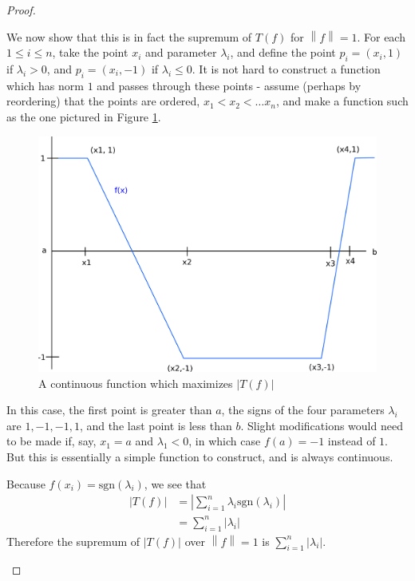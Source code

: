 \documentclass[12pt]{article}
\theoremstyle{definition}
\begin{document}
\begin{proof}
\begin{enumerate}[label=(\roman*)]
	We now show that this is in fact the supremum of $T(f)$ for $\left \lVert { f } \right \lVert = 1$. For each $1 \leq i \leq n$, take the point $x_i$ and parameter $\lambda_i$, and define the point $p_i = (x_i, 1)$ if $\lambda_i > 0$, and $p_i = (x_i, -1)$ if $\lambda_i \leq 0$. It is not hard to construct a function which has norm $1$ and passes through these points - assume (perhaps by reordering) that the points are ordered, $x_1 < x_2 < \dots x_n$, and make a function such as the one pictured in Figure \ref{fig:function}. 
	\begin{figure}
		\centering
		\includegraphics{hw_2_function.png}
		\caption{A continuous function which maximizes $\left \lvert { T(f) } \right \lvert $}
		\label{fig:function}
	\end{figure}
	In this case, the first point is greater than $a$, the signs of the four parameters $\lambda_i$ are $1, -1, -1, 1$, and the last point is less than $b$. Slight modifications would need to be made if, say, $x_1 = a$ and $\lambda_1 < 0$, in which case $f(a) = -1$ instead of $1$. But this is essentially a simple function to construct, and is always continuous.
	\par Because $f(x_i) = \text{sgn}(\lambda_i)$, we see that 
	\begin{align*}\left \lvert { T(f) } \right \lvert  &= \left \lvert { \sum_{i=1}^n } \lambda_i \text{sgn}(\lambda_i)\right \lvert \\
	&= \sum_{i=1}^n \left \lvert { \lambda_i } \right \lvert \end{align*}
	Therefore the supremum of $\left \lvert { T(f) } \right \lvert $ over $\left \lVert { f } \right \lVert  = 1$ is $\sum_{i=1}^n \left \lvert { \lambda_i } \right \lvert $.
	\end{enumerate}
\end{proof}
\end{document}
